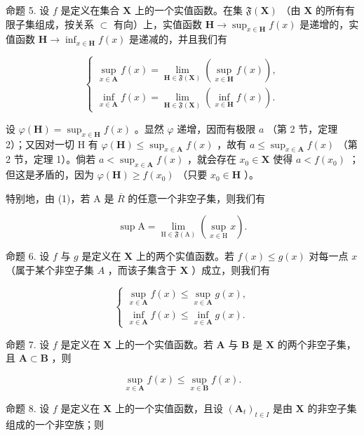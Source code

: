 命题 5. 设 \(f\) 是定义在集合 \(\mathbf{X}\) 上的一个实值函数。在集 \(\mathfrak{F}(\mathbf{X})\) （由 \(\mathbf{X}\) 的所有有限子集组成，按关系 \(\subset\) 有向）上，实值函数 \(\mathbf{H} \to \sup_{x \in \mathbf{H}} f(x)\) 是递增的，实值函数 \(\mathbf{H} \to \inf_{x \in \mathbf{H}} f(x)\) 是递减的，并且我们有

\[
\left\{ \begin{array}{l} \sup _ {x \in \mathbf {A}} f (x) = \lim _ {\mathbf {H} \in \mathfrak {F} (\mathbf {X})} (\sup _ {x \in \mathbf {H}} f (x)), \\ \inf _ {x \in \mathbf {A}} f (x) = \lim _ {\mathbf {H} \in \mathfrak {F} (\mathbf {X})} (\inf _ {x \in \mathbf {H}} f (x)). \end{array} \right.\tag{3}
\]

设 \(\varphi(\mathbf{H}) = \sup_{x \in \mathbf{H}} f(x)\) 。显然 \(\varphi\) 递增，因而有极限 \(a\) （第 2 节，定理 2）；又因对一切 H 有 \(\varphi(\mathbf{H}) \leqslant \sup_{x \in \mathbf{A}} f(x)\) ，故有 \(a \leqslant \sup_{x \in \mathbf{A}} f(x)\) （第 2 节，定理 1）。倘若 \(a < \sup_{x \in \mathbf{A}} f(x)\) ，就会存在 \(x_0 \in \mathbf{X}\) 使得 \(a < f(x_0)\) ；但这是矛盾的，因为 \(\varphi(\mathbf{H}) \geqslant f(x_0)\) （只要 \(x_0 \in \mathbf{H}\) ）。

特别地，由 (1)，若 A 是 \(\overline{R}\) 的任意一个非空子集，则我们有

\[
\sup \mathrm{A} = \lim _ {\mathrm{H} \in \mathfrak {F} (\mathrm{A})} (\sup _ {x \in \mathrm{H}} x).\tag{4}
\]

命题 6. 设 \(f\) 与 \(g\) 是定义在 \(\mathbf{X}\) 上的两个实值函数。若 \(f(x) \leqslant g(x)\) 对每一点 \(x\) （属于某个非空子集 \(A\) ，而该子集含于 \(\mathbf{X}\) ）成立，则我们有

\[
\left\{ \begin{array}{l} \sup _ {x \in \mathbf {A}} f (x) \leqslant \sup _ {x \in \mathbf {A}} g (x), \\ \inf _ {x \in \mathbf {A}} f (x) \leqslant \inf _ {x \in \mathbf {A}} g (x). \end{array} \right.\tag{5}
\]

命题 7. 设 \(f\) 是定义在 \(\mathbf{X}\) 上的一个实值函数。若 \(\mathbf{A}\) 与 \(\mathbf{B}\) 是 \(\mathbf{X}\) 的两个非空子集，且 \(\mathbf{A} \subset \mathbf{B}\) ，则

\[
\sup _ {x \in \mathbf {A}} f (x) \leqslant \sup _ {x \in \mathbf {B}} f (x).\tag{6}
\]

命题 8. 设 \(f\) 是定义在 \(\mathbf{X}\) 上的一个实值函数，且设 \((\mathbf{A}_t)_{t \in I}\) 是由 \(\mathbf{X}\) 的非空子集组成的一个非空族；则


